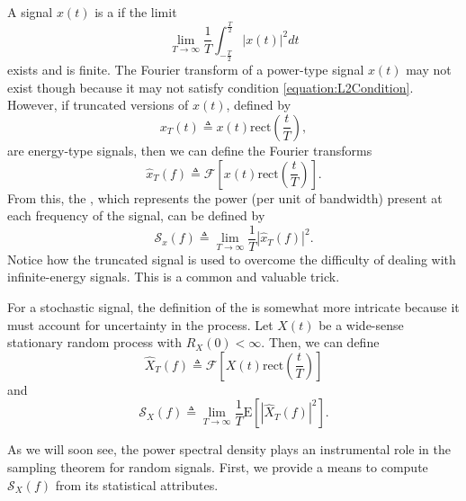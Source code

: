 A signal $x(t)$ is a  if the limit
\[ \lim_{T\rightarrow\infty} \frac{1}{T} \int_{-\frac{T}{2}}^{\frac{T}{2}} | x(t) |^2 dt \]
exists and is finite.
The Fourier transform of a power-type signal $x(t)$ may not exist though because it may not satisfy condition \eqref{equation:L2Condition}.
However, if truncated versions of $x(t)$, defined by
\begin{equation*}
x_T(t) \triangleq x(t) \mathrm{rect} \left( \frac{t}{T} \right) ,
\end{equation*}
are energy-type signals, then we can define the Fourier transforms
\begin{equation*}
\hat{x}_T(f) \triangleq \mathcal{F} \left[ x(t) \mathrm{rect} \left( \frac{t}{T} \right) \right] .
\end{equation*}
From this, the , which represents the power (per unit of bandwidth) present at each frequency of the signal, can be defined by
\begin{equation*}
\mathcal{S}_x(f) \triangleq \lim_{T \rightarrow \infty} \frac{1}{T} |\hat{x}_T(f)|^2 .
\end{equation*}
Notice how the truncated signal is used to overcome the difficulty of dealing with infinite-energy signals.
This is a common and valuable trick.
 
For a stochastic signal, the definition of the  is somewhat more intricate because it must account for uncertainty in the process.
Let $X(t)$ be a wide-sense stationary random process with $R_X(0) < \infty$.
Then, we can define
\begin{equation*}
\hat{X}_T(f) \triangleq \mathcal{F} \left[ X(t) \mathrm{rect} \left( \frac{t}{T} \right) \right] 
\end{equation*}
and
\begin{equation*}
\mathcal{S}_X(f) \triangleq \lim_{T \rightarrow \infty} \frac{1}{T} \mathrm{E} \left[ |\hat{X}_T(f)|^2 \right] .
\end{equation*}

As we will soon see, the power spectral density plays an instrumental role in the sampling theorem for random signals.
First, we provide a means to compute $\mathcal{S}_X(f)$ from its statistical attributes.

